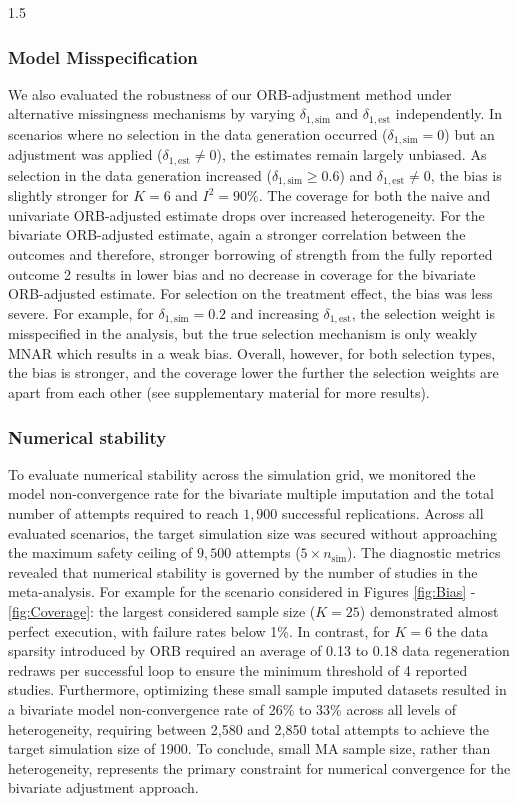 \documentclass{article}
\begin{document}
\begin{spacing}{1.5}
\subsubsection{Model Misspecification}
We also evaluated the robustness of our ORB-adjustment method under alternative missingness mechanisms by varying $\delta_{1,\text{sim}}$ and $\delta_{1,\text{est}}$ independently. 
In scenarios where no selection in the data generation occurred ($\delta_{1,\text{sim}} = 0$) but an adjustment was applied ($\delta_{1,\text{est}} \neq 0$), the estimates remain largely unbiased. As selection in the data generation increased ($\delta_{1,\text{sim}} \geq 0.6$) and $\delta_{1,\text{est}} \neq 0$, the bias is slightly stronger for $K = 6$ and $I^2 = 90\%$. The coverage for both the naive and univariate ORB-adjusted estimate drops over increased heterogeneity. For the bivariate ORB-adjusted estimate, again a stronger correlation between the outcomes and therefore, stronger borrowing of strength from the fully reported outcome 2 results in lower bias and no decrease in coverage for the bivariate ORB-adjusted estimate.
For selection on the treatment effect, the bias was less severe. For example, for $\delta_{1,\text{sim}} = 0.2$ and increasing $\delta_{1,\text{est}}$, the selection weight is misspecified in the analysis, but the true selection mechanism is only weakly MNAR which results in a weak bias. Overall, however, for both selection types, the bias is stronger, and the coverage lower the further the selection weights are apart from each other (see supplementary material for more results).

\subsubsection{Numerical stability}
To evaluate numerical stability across the simulation grid, we monitored the model non-convergence rate for the bivariate multiple imputation and the total number of attempts required to reach $1,900$ successful replications. Across all evaluated scenarios, the target simulation size was secured without approaching the maximum safety ceiling of $9,500$ attempts ($5 \times n_{\text{sim}}$). The diagnostic metrics revealed that numerical stability is  governed by the number of studies in the meta-analysis. For example for the scenario considered in Figures \ref{fig:Bias} - \ref{fig:Coverage}: the largest considered sample size ($K = 25$) demonstrated almost perfect execution, with failure rates below 1\%. In contrast, for $K = 6$ the data sparsity introduced by ORB required an average of 0.13 to 0.18 data regeneration redraws per successful loop to ensure the minimum threshold of 4 reported studies. Furthermore, optimizing these small sample imputed datasets resulted in a  bivariate model non-convergence rate of 26\% to 33\% across all levels of heterogeneity, requiring between 2,580 and 2,850 total attempts to achieve the target simulation size of 1900. To conclude,  small MA sample size, rather than heterogeneity, represents the primary constraint for numerical convergence for the bivariate adjustment approach.


\end{spacing}
\end{document}

